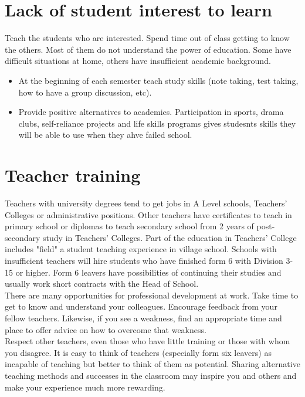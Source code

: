 \section{Lack of student interest to learn}
Teach the students who are interested.  Spend time out of class
getting to know the others.  Most of them do not understand the power
of education.  Some have difficult situations at home, others have
insufficient academic background.
\begin{itemize}
\item At the beginning of each semester teach study skills (note taking, test taking, how to have a group discussion, etc).
\item Provide positive alternatives to academics. Participation in sports, drama clubs, self-reliance projects and life skills programs gives studesnts skills they will be able to use when they ahve failed school.
\end{itemize}
\section{Teacher training}
Teachers with university degrees tend to get jobs in A Level schools,
Teachers' Colleges or administrative positions.  Other teachers have
certificates to teach in primary school or diplomas to teach secondary
school from 2 years of post-secondary study in Teachers' Colleges.
Part of the education in Teachers' College includes "field" a student
teaching experience in village school.  Schools with insufficient
teachers will hire students who have finished form 6 with Division
3-15 or higher.  Form 6 leavers have possibilities of continuing their
studies and usually work short contracts with the Head of School.\\

There are many opportunities for professional development at work.
Take time to get to know and understand  your colleagues.  Encourage
feedback from your fellow teachers.  Likewise, if you see a weakness,
find an appropriate time and place to offer advice on how to overcome
that weakness.\\

Respect other teachers, even those who have little training or those
with whom you disagree.  It is easy to think of teachers (especially
form six leavers) as incapable of teaching but better to think of them
as potential.  Sharing alternative teaching methods and successes in
the classroom may inspire you and others and make your experience much
more rewarding.

